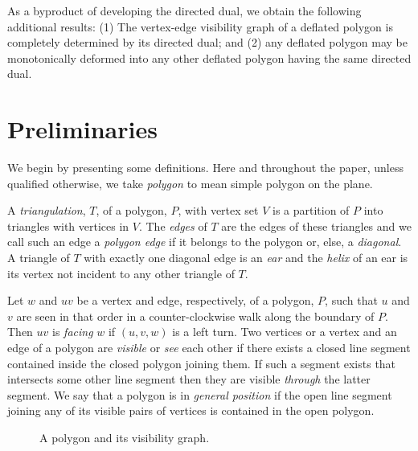 \documentclass{patmorin}
\begin{document}
As a byproduct of developing the directed dual, we obtain the
following additional results: (1) The vertex-edge visibility graph of
a deflated polygon is completely determined by its directed dual; and
(2) any deflated polygon may be monotonically deformed into any other
deflated polygon having the same directed dual.

\fi


\section{Preliminaries}

We begin by presenting some definitions.  Here and throughout the
paper, unless qualified otherwise, we take \emph{polygon} to mean
simple polygon on the plane.

A \emph{triangulation}, $T$, of a polygon, $P$, with vertex set $V$ is
a partition of $P$ into triangles with vertices in $V$.  The
\emph{edges} of $T$ are the edges of these triangles and we call such
an edge a \emph{polygon edge} if it belongs to the polygon or, else, a
\emph{diagonal}.  A triangle of $T$ with exactly one diagonal edge is
an \emph{ear} and the \emph{helix} of an ear is its vertex not
incident to any other triangle of $T$.


Let $w$ and $uv$ be a vertex and edge, respectively, of a polygon,
$P$, such that $u$ and $v$ are seen in that order in a
counter-clockwise walk along the boundary of $P$.  Then $uv$
is \emph{facing} $w$ if $(u,v,w)$ is a left turn.  Two vertices or a
vertex and an edge of a polygon are \emph{visible} or \emph{see} each
other if there exists a closed line segment contained inside the
closed polygon joining them.  If such a segment exists that intersects
some other line segment then they are visible \emph{through} the
latter segment.  We say that a polygon is in \emph{general position}
if the open line segment joining any of its visible pairs of vertices
is contained in the open polygon.

\begin{figure}[htb]
  \centering
  \quad
  \caption{\protect{} A polygon
    and \protect{} its visibility graph.}
  \label{fig:vv-vis-graph}
\end{figure}
\end{document}
